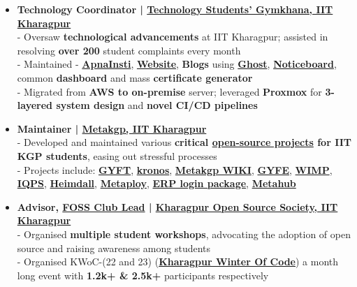 \documentclass[a4paper,10pt]{extarticle} %
\begin{document}
\begin{itemize}[leftmargin=0.55cm, rightmargin=0.2cm, label={\Large\textbullet}]

\item \textbf{Technology Coordinator | \href{https://gymkhana.iitkgp.ac.in/}{Technology Students' Gymkhana, IIT Kharagpur}}\\
- Oversaw \textbf{technological advancements} at IIT Kharagpur;  assisted in resolving \textbf{over 200} student complaints every month \\
- Maintained - \href{https://play.google.com/store/apps/details?id=com.apnainsti&pli=1}{\textbf{ApnaInsti}}, \href{https://gymkhana.iitkgp.ac.in/}{\textbf{Website}}, \textbf{Blogs} using \href{https://ghost.org/}{\textbf{Ghost}}, \href{https://github.com/tsg-iitkgp/noticeboard}{\textbf{Noticeboard}}, common \textbf{dashboard} and mass \textbf{certificate generator} \\
- Migrated from \textbf{AWS to on-premise} server; leveraged \textbf{Proxmox} for \textbf{3-layered system design} and \textbf{novel CI/CD pipelines}

\item \textbf{Maintainer | \href{https://metakgp.org/}{Metakgp, IIT Kharagpur}}\\
- Developed and maintained various \textbf{critical \href{https://github.com/metakgp}{open-source projects} for IIT KGP students}, easing out stressful processes \\
- Projects include: \href{https://github.com/metakgp/gyft}{\textbf{GYFT}}, \href{http://kronos.streamlit.app}{\textbf{kronos}}, \href{https://wiki.metakgp.org}{\textbf{Metakgp WIKI}}, \href{https://gyfe.metakgp.org}{\textbf{GYFE}}, \href{https://github.com/metakgp/wimp}{\textbf{WIMP}}, \href{https://qp.metakgp.org}{\textbf{IQPS}}, \href{https://heimdall.metakgp.org}{\textbf{Heimdall}}, \href{https://github.com/metakgp/metaploy}{\textbf{Metaploy}}, \href{https://pypi.org/project/iitkgp-erp-login/}{\textbf{ERP login package}}, \href{https://github.com/proffapt/Metahub}{\textbf{Metahub}}

\item \textbf{Advisor, \href{https://fossunited.org/clubs}{\textbf{FOSS Club Lead}} | \href{https://kossiitkgp.org}{Kharagpur Open Source Society, IIT Kharagpur}}\\
- Organised \textbf{multiple student workshops}, advocating the adoption of open source and raising awareness among students \\
- Organised KWoC-(22 and 23) (\textbf{\href{https://kwoc.kossiitkgp.org/}{Kharagpur Winter Of Code}}) a month long event with \textbf{1.2k+ \& 2.5k+} participants respectively

\end{itemize}
\end{document}
